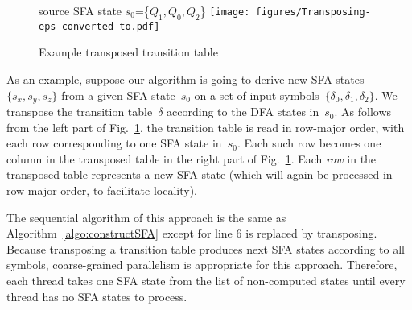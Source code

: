 \documentclass[10pt, conference, compsocconf]{IEEEtran}
\newcommand\StateSet[1][{}]{\ensuremath{Q_{#1}}}
\begin{document}
\begin{figure}[htp]
\centering
    source SFA state $s_0$=\{$\StateSet[1], \StateSet[0], \StateSet[2]$\}
    \texttt{[image: figures/Transposing-eps-converted-to.pdf]}
\caption{Example transposed transition table}
\label{fig:transposedTable}
\end{figure}

As an example, suppose our algorithm is going to derive new SFA states
$\{s_x, s_y, s_z\}$ from a given SFA state~$s_0$ on a set of input
symbols~$\{\delta_0, \delta_1, \delta_2\}$. We transpose the transition
table~$\delta$ according to the DFA states in~$s_0$.  As follows from the left
part of Fig.~\ref{fig:transposedTable}, the transition table is read in
row-major order, with each row corresponding to one SFA state in~$s_0$. Each
such row becomes one column in the transposed table in the right part of
Fig.~\ref{fig:transposedTable}.  Each {\em row\/} in the transposed table
represents a new SFA state (which will again be processed in row-major order,
to facilitate locality).

The sequential algorithm of this approach is the same as Algorithm~\ref{algo:constructSFA} except 
for line 6 is replaced by transposing. Because transposing a transition table produces next SFA states
according to all symbols, coarse-grained parallelism is appropriate for this approach. 
Therefore, each thread takes one SFA state from the list of non-computed states until every thread
has no SFA states to process.
\end{document}
